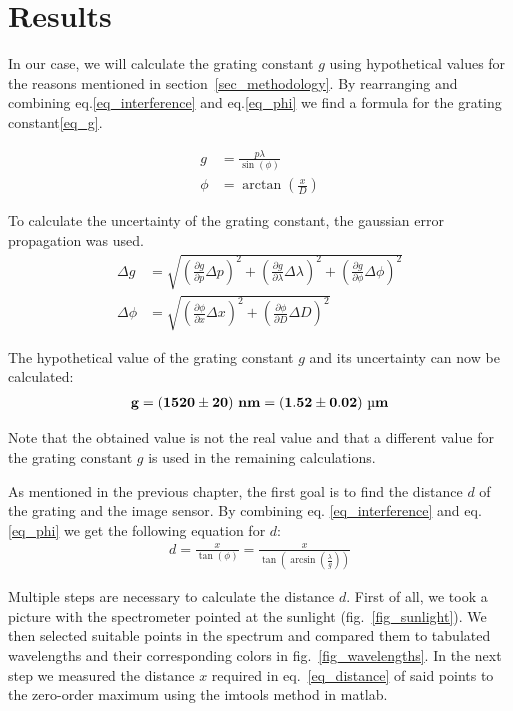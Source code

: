 \section{Results}\label{sec_results}

In our case, we will calculate the grating constant $g$ using hypothetical values for the reasons mentioned in section~\ref{sec_methodology}.
By rearranging and combining eq.\ref{eq_interference} and eq.\ref{eq_phi} we find a formula for the grating constant\ref{eq_g}.

\begin{align}
    g &= \frac{p \lambda}{\sin(\phi)} \label{eq_g}\\
    \phi &= \arctan \left( \frac{x}{D} \right)
\end{align}

To calculate the uncertainty of the grating constant, the gaussian error propagation was used.
\begin{align}
    \Delta g &= \sqrt{\left( \frac{\partial g}{\partial p} \Delta p \right)^2 + \left( \frac{\partial g}{\partial \lambda} \Delta \lambda \right)^2 + \left( \frac{\partial g}{\partial \phi} \Delta \phi \right)^2}\\
    \Delta \phi &= \sqrt{\left( \frac{\partial \phi}{\partial x} \Delta x \right)^2 + \left( \frac{\partial \phi}{\partial D} \Delta D \right)^2}
\end{align}

The hypothetical value of the grating constant $g$ and its uncertainty can now be calculated:
\begin{align}
    \bf g = (1520 \pm 20) ~\si{\bf\nano\meter} = (1.52 \pm 0.02) ~\si{\bf\micro\meter} \label{res_g}
\end{align}

Note that the obtained value is not the real value and that a different value for the grating constant $g$ \cite{src_grating_constant} is used in the remaining calculations.

As mentioned in the previous chapter, the first goal is to find the distance $d$ of the grating
and the image sensor.
By combining eq. \ref{eq_interference} and eq. \ref{eq_phi} we get the following equation for $d$:
\begin{align}
    d = \frac{x}{\tan(\phi)} = \frac{x}{\tan(\arcsin(\frac{\lambda}{g}))} \label{eq_distance}
\end{align}

Multiple steps are necessary to calculate the distance $d$.
First of all, we took a picture with the spectrometer pointed at the sunlight (fig.~\ref{fig_sunlight}). We then selected suitable 
points in the spectrum and compared them to tabulated wavelengths and their corresponding colors 
in fig.~\ref{fig_wavelengths}. In the next step we measured the distance $x$ required in eq.~\ref{eq_distance} of said points to the zero-order maximum
using the imtools method in matlab.

